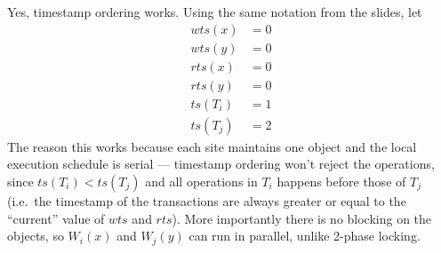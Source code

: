 Yes, timestamp ordering works.
Using the same notation from the slides, let
\begin{align*}
wts(x) &= 0 \\
wts(y) &= 0 \\
rts(x) &= 0 \\
rts(y) &= 0 \\
ts(T_i) &= 1 \\
ts(T_j) &= 2
\end{align*}
The reason this works because each site maintains one object and the local execution schedule is serial --- timestamp ordering won't reject the operations, since $ts(T_i) < ts(T_j)$ and all operations in $T_i$ happens before those of $T_j$ (i.e.\ the timestamp of the transactions are always greater or equal to the ``current'' value of $wts$ and $rts$).
More importantly there is no blocking on the objects, so $W_i(x)$ and $W_j(y)$ can run in parallel, unlike 2-phase locking.
